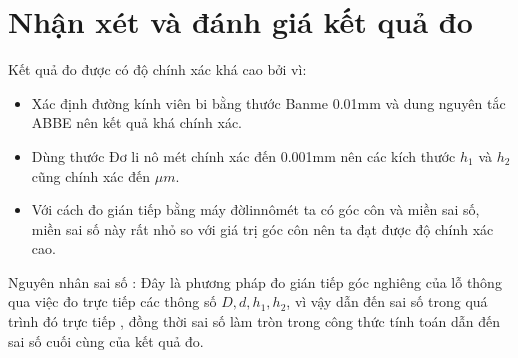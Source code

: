 \section{Nhận xét và đánh giá kết quả đo}
Kết quả đo được có độ chính xác khá cao bởi vì:
\begin{itemize}
	\item Xác định đường kính viên bi bằng thước Banme 0.01mm và dung nguyên tắc ABBE nên kết quả khá chính xác.
	\item Dùng thước Đơ li nô mét chính xác đến 0.001mm nên các kích thước $ h_1 $ và $ h_2 $ cũng chính xác đến $ \mu m $. 
	\item Với cách đo gián tiếp bằng máy đờlinnômét ta có góc côn và miền sai số, miền sai số này rất nhỏ so với giá trị góc côn nên ta đạt được độ chính xác cao.
\end{itemize}
Nguyên nhân sai số : Đây là phương pháp đo gián tiếp góc nghiêng của lỗ thông qua việc đo trực tiếp các thông số $ D,d,h_1,h_2 $, vì vậy dẫn đến sai số trong quá trình đó trực tiếp , đồng thời sai số làm tròn trong công thức tính toán dẫn đến sai số cuối cùng của kết quả đo.